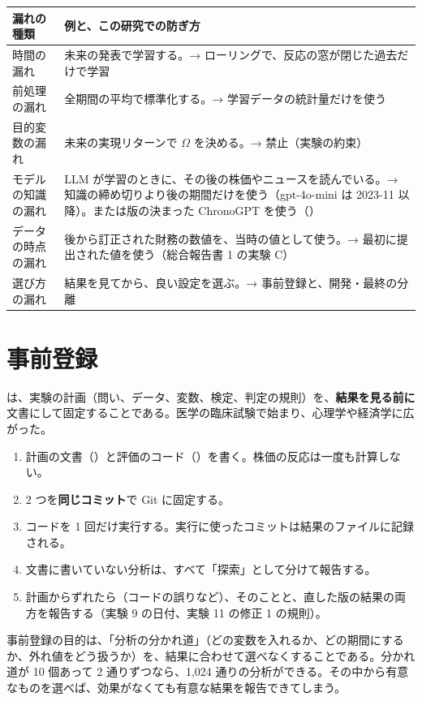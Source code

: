 \begin{longtable}{P{4.0cm}P{10.4cm}}
\toprule
\textbf{漏れの種類} & \textbf{例と、この研究での防ぎ方} \\
\midrule
\endhead
\bottomrule
\endfoot
時間の漏れ & 未来の発表で学習する。→ ローリングで、反応の窓が閉じた過去だけで学習 \\
前処理の漏れ & 全期間の平均で標準化する。→ 学習データの統計量だけを使う \\
目的変数の漏れ & 未来の実現リターンで $\Omega$ を決める。→ 禁止（実験の約束） \\
モデルの知識の漏れ & LLM が学習のときに、その後の株価やニュースを読んでいる。→ 知識の締め切りより後の期間だけを使う（gpt-4o-mini は 2023-11 以降）。または版の決まった ChronoGPT を使う（） \\
データの時点の漏れ & 後から訂正された財務の数値を、当時の値として使う。→ 最初に提出された値を使う（総合報告書 1 の実験 C） \\
選び方の漏れ & 結果を見てから、良い設定を選ぶ。→ 事前登録と、開発・最終の分離 \\
\end{longtable}

\section{事前登録}

は、実験の計画（問い、データ、変数、検定、判定の規則）を、\textbf{結果を見る前に}文書にして固定することである。医学の臨床試験で始まり、心理学や経済学に広がった。

\begin{keybox}[この研究の事前登録のやり方]
\begin{enumerate}
\item 計画の文書（）と評価のコード（）を書く。株価の反応は一度も計算しない。
\item 2 つを\textbf{同じコミット}で Git に固定する。
\item コードを 1 回だけ実行する。実行に使ったコミットは結果のファイルに記録される。
\item 文書に書いていない分析は、すべて「探索」として分けて報告する。
\item 計画からずれたら（コードの誤りなど）、そのことと、直した版の結果の両方を報告する（実験 9 の日付、実験 11 の修正 1 の規則）。
\end{enumerate}
\end{keybox}

事前登録の目的は、「分析の分かれ道」（どの変数を入れるか、どの期間にするか、外れ値をどう扱うか）を、結果に合わせて選べなくすることである。分かれ道が 10 個あって 2 通りずつなら、1,024 通りの分析ができる。その中から有意なものを選べば、効果がなくても有意な結果を報告できてしまう。

